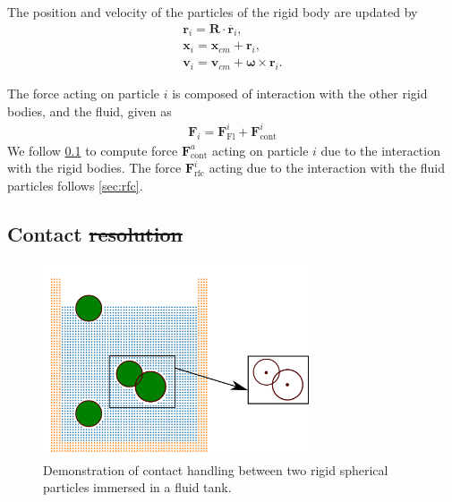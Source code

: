 \documentclass[preprint,12pt]{elsarticle}
\newcommand{\teng}[1]{\ensuremath{\boldsymbol{#1}}}
\newcommand{\ten}[1]{\ensuremath{\mathbf{#1}}}
\providecommand{\DIFaddtex}[1]{{\protect\color{blue}\uwave{#1}}} %
\providecommand{\DIFdeltex}[1]{{\protect\color{red}\sout{#1}}}                      %
\providecommand{\DIFaddbegin}{} %
\providecommand{\DIFaddend}{} %
\providecommand{\DIFdelbegin}{} %
\providecommand{\DIFdelend}{} %
\providecommand{\DIFadd}[1]{\texorpdfstring{\DIFaddtex{#1}}{#1}} %
\providecommand{\DIFdel}[1]{\texorpdfstring{\DIFdeltex{#1}}{}} %
\newcommand{\DIFscaledelfig}{0.5}
\newlength{\DIFdelgraphicswidth} %
\newlength{\DIFdelgraphicsheight} %
\newcommand{\DIFaddincludegraphics}[2][]{{\color{blue}\fbox{\DIFOincludegraphics[#1]{#2}}}} %
\newcommand{\DIFdelincludegraphics}[2][]{%
\sbox{\DIFdelgraphicsbox}{\DIFOincludegraphics[#1]{#2}}%
\settoboxwidth{\DIFdelgraphicswidth}{\DIFdelgraphicsbox} %
\settoboxtotalheight{\DIFdelgraphicsheight}{\DIFdelgraphicsbox} %
\scalebox{\DIFscaledelfig}{%
\parbox[b]{\DIFdelgraphicswidth}{\usebox{\DIFdelgraphicsbox}\\[-\baselineskip] \rule{\DIFdelgraphicswidth}{0em}}\llap{\resizebox{\DIFdelgraphicswidth}{\DIFdelgraphicsheight}{%
\setlength{\unitlength}{\DIFdelgraphicswidth}%
\begin{picture}(1,1)%
\thicklines\linethickness{2pt} %
{\color[rgb]{1,0,0}\put(0,0){\framebox(1,1){}}}%
{\color[rgb]{1,0,0}\put(0,0){\line( 1,1){1}}}%
{\color[rgb]{1,0,0}\put(0,1){\line(1,-1){1}}}%
\end{picture}%
}\hspace*{3pt}}} %
} %
\DeclareRobustCommand{\DIFaddbegin}{\DIFOaddbegin \let\includegraphics\DIFaddincludegraphics} %
\DeclareRobustCommand{\DIFaddend}{\DIFOaddend \let\includegraphics\DIFOincludegraphics} %
\DeclareRobustCommand{\DIFdelbegin}{\DIFOdelbegin \let\includegraphics\DIFdelincludegraphics} %
\DeclareRobustCommand{\DIFdelend}{\DIFOaddend \let\includegraphics\DIFOincludegraphics} %
\begin{document}
The position and velocity of the particles of the rigid body are updated by
\begin{eqnarray}
  \label{eq:rfc:rb_particle_pos_update}
  \ten{r}_i = \ten{R} \cdot \overline{\ten{r}}_{i},\\
  \ten{x}_i = \ten{x}_{cm} + \ten{r}_{i},\\
  \ten{v}_i = \ten{v}_{cm} + \teng{\omega} \times \ten{r}_{i}.
\end{eqnarray}

The force acting on particle $i$ is composed of interaction with the other rigid
bodies, and the fluid, given as
\begin{eqnarray}
  \label{eq:rfc:rb_particle_pos_update}
  \ten{F}_i = \ten{F}_{\text{Fl}}^i + \ten{F}_{\text{cont}}^i
\end{eqnarray}
We follow \cref{sec:dem} to compute force
$\ten{F}_{\text{cont}}^a$ acting on particle $i$ due to the interaction with
the rigid bodies. The force $\ten{F}_{\text{rfc}}^i$ acting due to the
interaction with the fluid particles follows \cref{sec:rfc}.



\FloatBarrier%
\subsection{Contact \DIFdelbegin \DIFdel{resolution}\DIFdelend \DIFaddbegin \DIFadd{models}\DIFaddend }
\label{sec:dem}

\begin{figure}[!htpb]
  \centering
  \includegraphics[width=0.7\textwidth]{images/spherical_particles_dem_representation}
  \caption{Demonstration of contact handling between two rigid spherical
    particles immersed in a fluid tank.}
  \label{fig:spherical-particles-in-tank-dem}
\end{figure}
\end{document}
